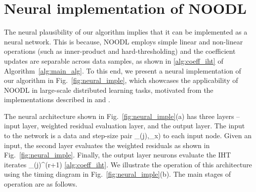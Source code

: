 \documentclass{article}
\def\[#1\]{{$#1$}}
\def\b#1{{\mathbf{#1}}}
\begin{document}
	
	
	
	
	
	
  
	










\vspace*{-3pt}
\section{Neural implementation of NOODL}\label{app:neural}
\vspace{-3pt}
The neural plausibility of our algorithm implies that it can be implemented as a neural network. This is because, NOODL employs simple linear and non-linear operations (such as inner-product and hard-thresholding) and the coefficient updates are separable across data samples, as shown in \eqref{alg:coeff_iht} of Algorithm~\ref{alg:main_alg}. To this end, we present a neural implementation of our algorithm in Fig.~\ref{fig:neural_imple}, which showcases the applicability of NOODL in large-scale distributed learning tasks, motivated from the implementations described in \citep{Olshausen97} and \citep{Arora15}. 





































The neural architecture shown in Fig.~\ref{fig:neural_imple}(a) has three layers -- input layer, weighted residual evaluation layer, and the output layer.  The input to the network is a data and step-size pair \[(\b{y}_{(j)},\eta_x)\] to each input node. Given an input, the second layer evaluates the weighted residuals as shown in Fig.~\ref{fig:neural_imple}. Finally, the output layer neurons evaluate the IHT iterates \[\b{x}_{(j)}^{(r+1)}\] \eqref{alg:coeff_iht}. We illustrate the operation of this architecture using the timing diagram in Fig.~\ref{fig:neural_imple}(b). The main stages of operation are as follows.
\end{document}
